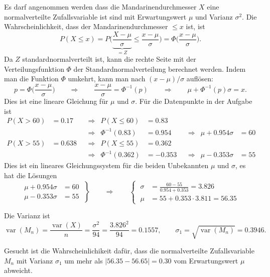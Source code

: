 \begin{loesung}
\begin{teilaufgaben}
\item
Es darf angenommen werden dass die Mandarinendurchmesser $X$ eine
normalverteilte Zufallsvariable ist sind mit Erwartungswert $\mu$
und Varianz $\sigma^2$.
Die Wahrscheinlichkeit, dass der Mandarinendurchmesser $\le x$ ist,
ist
\[
P(X\le x)
=
P\biggl(
\underbrace{\frac{X-\mu}{\sigma}}_{\displaystyle=Z}
\le
\frac{x-\mu}{\sigma}
\biggr)
=
\Phi\biggl(
\frac{x-\mu}{\sigma}
\biggr).
\]
Da $Z$ standardnormalverteilt ist, kann die rechte Seite mit der
Verteilungsfunktion $\Phi$ der Standardnormalverteilung berechnet werden.
Indem man die Funktion $\Phi$ umkehrt, kann man nach $(x-\mu)/\sigma$
auflösen:
\[
p
=
\Phi\biggl(\frac{x-\mu}{\sigma}\biggr)
\qquad\Rightarrow\qquad
\frac{x-\mu}{\sigma}
=
\Phi^{-1}(p)
\qquad\Rightarrow\qquad
\mu + \Phi^{-1}(p)\sigma = x.
\]
Dies ist eine lineare Gleichung für $\mu$ und $\sigma$.
Für die Datenpunkte in der Aufgabe ist
\begin{align*}
P(X > 60) &= 0.17  &&\Rightarrow& P(X\le 60) &= 0.83 \\
          &        &&\Rightarrow& \Phi^{-1}(0.83) &= 0.954
&&\Rightarrow& \mu+0.954 \sigma &= 60\\[4pt]
P(X > 55) &= 0.638 &&\Rightarrow& P(X\le 55) &= 0.362 \\
          &        &&\Rightarrow& \Phi^{-1}(0.362) &= -0.353
&&\Rightarrow& \mu-0.353 \sigma &= 55
\end{align*}
Dies ist ein lineares Gleichungssystem für die beiden Unbekannten $\mu$
und $\sigma$, es hat die Lösungen
\[
\left.\begin{aligned}
\mu+0.954 \sigma &= 60\\
\mu-0.353 \sigma &= 55
\end{aligned}\;\right\}
\qquad\Rightarrow\qquad
\left\{\;\begin{aligned}
\sigma&= \frac{60-55}{0.954+0.353} = 3.826\\
\mu   &= 55+0.353\cdot 3.811 = 56.35
\end{aligned}\right.
\]
\item
Die Varianz ist
\[
\operatorname{var}(M_n)
=
\frac{\operatorname{var}(X)}{n}
=
\frac{\sigma^2}{94}
=
\frac{3.826^2}{94}
=
0.1557,
\qquad
\sigma_1
=
\sqrt{\operatorname{var}(M_n)} = 0.3946.
\]
\item
Gesucht ist die Wahrscheinlichikeit dafür, dass die normalverteilte 
Zufallsvariable $M_n$ mit Varianz $\sigma_1$ um mehr als
$|56.35-56.65|=0.30$ vom Erwartungswert $\mu$ abweicht.

\end{teilaufgaben}
\end{loesung}
